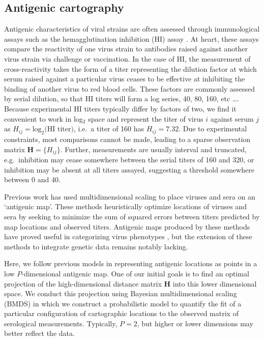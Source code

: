 \documentclass[11pt,oneside,letterpaper]{article}
\begin{document}
\subsection*{Antigenic cartography}

Antigenic characteristics of viral strains are often assessed through immunological assays such as the hemagglutination inhibition (HI) assay \cite{Hirst43}.  
At heart, these assays compare the reactivity of one virus strain to antibodies raised against another virus strain via challenge or vaccination.  
In the case of HI, the measurement of cross-reactivity takes the form of a titer representing the dilution factor at which serum raised against a particular virus ceases to be effective at inhibiting the binding of another virus to red blood cells.  
These factors are commonly assessed by serial dilution, so that HI titers will form a log series, 40, 80, 160, etc \dots.
Because experimental HI titers typically differ by factors of two, we find it convenient to work in log$_2$ space and represent the titer of virus $i$ against serum $j$ as $H_{ij} = \mathrm{log}_2 \mbox{(HI titer)}$, i.e.\ a titer of 160 has $H_{ij} = 7.32$.
Due to experimental constraints, most comparisons cannot be made, leading to a sparse observation matrix $\mathbf{H} = \{H_{ij}\}$.  
Further, measurements are usually interval and truncated, e.g.\ inhibition may cease somewhere between the serial titers of 160 and 320, or inhibition may be absent at all titers assayed, suggesting a threshold somewhere between 0 and 40.  

Previous work \cite{Smith04, Cai10} has used multidimensional scaling to place viruses and sera on an `antigenic map'.  
These methods heuristically optimize locations of viruses and sera by seeking to minimize the sum of squared errors between titers predicted by map locations and observed titers.  
Antigenic maps produced by these methods have proved useful in categorizing virus phenotypes \cite{Smith04}, but the extension of these methods to integrate genetic data remains notably lacking.

Here, we follow previous models in representing antigenic locations as points in a low $P$-dimensional antigenic map. 
One of our initial goals is to find an optimal projection of the high-dimensional distance matrix $\mathbf{H}$ into this lower dimensional space. 
We conduct this projection using Bayesian multidimensional scaling (BMDS) \cite{Oh01} in which we construct a probabilistic model to quantify the fit of a particular configuration of cartographic locations to the observed matrix of serological measurements.
Typically, $P = 2$, but higher or lower dimensions may better reflect the data. 
\end{document}
